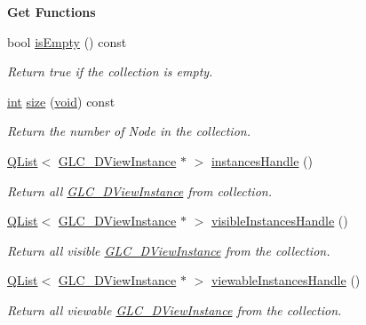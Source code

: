 \begin{Indent}{\bf Get Functions}\par
\begin{DoxyCompactItemize}
\item 
bool \hyperlink{class_g_l_c__3_d_view_collection_a45864e5c616a230f79569a5fa3aa0efc}{is\-Empty} () const 
\begin{DoxyCompactList}\small\item\em Return true if the collection is empty. \end{DoxyCompactList}\item 
\hyperlink{ioapi_8h_a787fa3cf048117ba7123753c1e74fcd6}{int} \hyperlink{class_g_l_c__3_d_view_collection_af979f883e77e0fce1eb3e3a1827a1e01}{size} (\hyperlink{group___u_a_v_objects_plugin_ga444cf2ff3f0ecbe028adce838d373f5c}{void}) const 
\begin{DoxyCompactList}\small\item\em Return the number of Node in the collection. \end{DoxyCompactList}\item 
\hyperlink{class_q_list}{Q\-List}$<$ \hyperlink{class_g_l_c__3_d_view_instance}{G\-L\-C\-\_\-D\-View\-Instance} $\ast$ $>$ \hyperlink{class_g_l_c__3_d_view_collection_a5d86a2bc8b9be4ab976ca81d391c4f4a}{instances\-Handle} ()
\begin{DoxyCompactList}\small\item\em Return all \hyperlink{class_g_l_c__3_d_view_instance}{G\-L\-C\-\_\-D\-View\-Instance} from collection. \end{DoxyCompactList}\item 
\hyperlink{class_q_list}{Q\-List}$<$ \hyperlink{class_g_l_c__3_d_view_instance}{G\-L\-C\-\_\-D\-View\-Instance} $\ast$ $>$ \hyperlink{class_g_l_c__3_d_view_collection_a90c2d595eeb3f8336ee03f20779727ed}{visible\-Instances\-Handle} ()
\begin{DoxyCompactList}\small\item\em Return all visible \hyperlink{class_g_l_c__3_d_view_instance}{G\-L\-C\-\_\-D\-View\-Instance} from the collection. \end{DoxyCompactList}\item 
\hyperlink{class_q_list}{Q\-List}$<$ \hyperlink{class_g_l_c__3_d_view_instance}{G\-L\-C\-\_\-D\-View\-Instance} $\ast$ $>$ \hyperlink{class_g_l_c__3_d_view_collection_a98519c6d07611b12e3b082a48f64d142}{viewable\-Instances\-Handle} ()
\begin{DoxyCompactList}\small\item\em Return all viewable \hyperlink{class_g_l_c__3_d_view_instance}{G\-L\-C\-\_\-D\-View\-Instance} from the collection. \end{DoxyCompactList}\item 

\end{DoxyCompactItemize}
\end{Indent}
